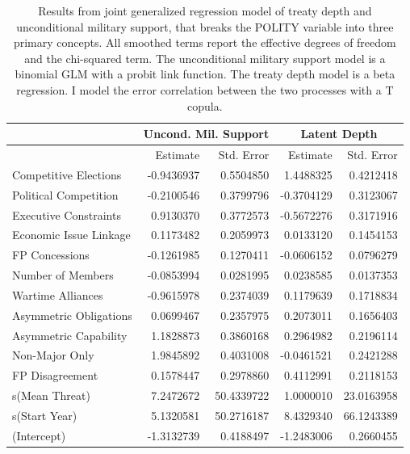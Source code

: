 \documentclass[12pt]{article}
\begin{document}
\begin{table}[ht]
\centering
\begin{tabular}{lrrrr}
  & \multicolumn{2}{c}{Uncond. Mil. Support} & \multicolumn{2}{c}{Latent Depth}\\ \hline
    & Estimate & Std. Error & Estimate & Std. Error \\ 
  \hline
  Competitive Elections & -0.9436937 & 0.5504850 & 1.4488325 & 0.4212418 \\ 
  Political Competition & -0.2100546 & 0.3799796 & -0.3704129 & 0.3123067 \\ 
  Executive Constraints & 0.9130370 & 0.3772573 & -0.5672276 & 0.3171916 \\ 
  Economic Issue Linkage & 0.1173482 & 0.2059973 & 0.0133120 & 0.1454153 \\ 
  FP Concessions & -0.1261985 & 0.1270411 & -0.0606152 & 0.0796279 \\ 
  Number of Members & -0.0853994 & 0.0281995 & 0.0238585 & 0.0137353 \\ 
  Wartime Alliances & -0.9615978 & 0.2374039 & 0.1179639 & 0.1718834 \\ 
  Asymmetric Obligations & 0.0699467 & 0.2357975 & 0.2073011 & 0.1656403 \\ 
  Asymmetric Capability & 1.1828873 & 0.3860168 & 0.2964982 & 0.2196114 \\ 
  Non-Major Only & 1.9845892 & 0.4031008 & -0.0461521 & 0.2421288 \\ 
  FP Disagreement & 0.1578447 & 0.2978860 & 0.4112991 & 0.2118153 \\ 
  s(Mean Threat) & 7.2472672 & 50.4339722 & 1.0000010 & 23.0163958 \\ 
  s(Start Year) & 5.1320581 & 50.2716187 & 8.4329340 & 66.1243389 \\
  (Intercept) & -1.3132739 & 0.4188497 & -1.2483006 & 0.2660455 \\  
   \hline
\end{tabular}
\caption{Results from joint generalized regression model of treaty depth and unconditional military support, that breaks the POLITY variable into three primary concepts.  
                     All smoothed terms report the effective degrees of freedom and the chi-squared term. 
                     The unconditional military support model is a binomial GLM with a probit link function. 
                     The treaty depth model is a beta regression. 
                    I model the error correlation between the two processes with a T copula.} 
\label{tab:gjrm-res-split}
\end{table}
\end{document}
